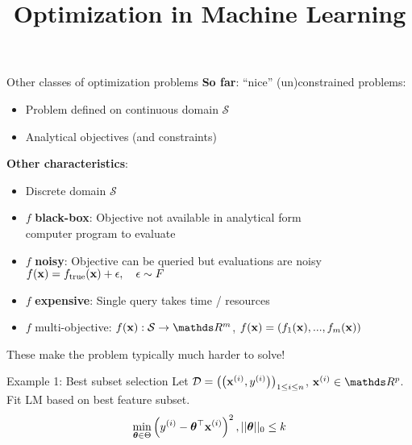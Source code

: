 \documentclass[11pt,compress,t,notes=noshow, xcolor=table]{beamer}
\title{Optimization in Machine Learning}
\begin{document}

\begin{frame2}{Other classes of optimization problems}
\textbf{So far}: \enquote{nice} (un)constrained problems:
\begin{itemize}
\item Problem defined on continuous domain $\mathcal{S}$
\item Analytical objectives (and constraints)
\end{itemize}
\textbf{Other characteristics}:
\begin{itemize}
\item Discrete domain $\mathcal{S}$
\item $f$ \textbf{black-box}: Objective not available in analytical form\\computer program to evaluate
\item $f$ \textbf{noisy}: Objective can be queried but evaluations are noisy $f(\mathbf{x}) = f_{\text{true}}(\mathbf{x}) + \epsilon, \quad \epsilon \sim F$
\item $f$ \textbf{expensive}: Single query takes time / resources
\item $f$ multi-objective: $\fx: \mathcal{S} \to \R^m$, $f(\mathbf{x}) = \left(f_1(\mathbf{x}), ..., f_m(\mathbf{x})\right)$
\end{itemize}
These make the problem typically much harder to solve!
\end{frame2}


\begin{frame2}{Example 1: Best subset selection}
Let {\footnotesize $\mathcal{D} = \left(\left(\mathbf{x}^{(i)}, y^{(i)}\right)\right)_{1 \le i \le n}$, $\xi \in \R^p$}. Fit LM based on best feature subset.
$$
\min_{\bm{\theta} \in \Theta} \left(y^{(i)} - \bm{\theta}^\top \mathbf{x}^{(i)}\right)^2, ||\bm{\theta}||_{0} \leq k
$$
\spacer
{}
\end{frame2}
\end{document}
